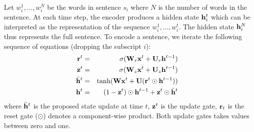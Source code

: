 \documentclass{article} \usepackage{nips15submit_e,times}
\begin{document}
 Let $w^1_i, \ldots, w^N_i$ be the words in sentence $s_i$ where $N$ is the number of words in the sentence. At each time step, the encoder produces a hidden state ${\bf h}^t_i$ which can be interpreted as the representation of the sequence $w^1_i, \ldots, w^t_i$. The hidden state ${\bf h}^N_i$  thus represents the full sentence. To encode a sentence, we iterate the following sequence of equations (dropping the subscript $i$):
\begin{eqnarray}
{\bf r}^t &=& \sigma ( {\bf W}_r {\bf x}^t + {\bf U}_r {\bf h}^{t-1} ) \\
{\bf z}^t &=& \sigma ( {\bf W}_z {\bf x}^t + {\bf U}_z {\bf h}^{t-1} ) \\
\bar{{\bf h}}^t &=& \text{tanh} ( {\bf W} {\bf x}^t + {\bf U} ( {\bf r}^t \odot {\bf h}^{t-1} )) \\
{\bf h}^t &=& (1 - {\bf z}^t) \odot {\bf h}^{t-1} + {\bf z}^t \odot \bar{{\bf h}}^t
\end{eqnarray}
where $\bar{{\bf h}}^t$ is the proposed state update at time $t$, ${\bf z}^t$ is the update gate, ${\bf r}_t$ is the reset gate ($\odot$) denotes a component-wise product. Both update gates takes values between zero and one.
\end{document}
